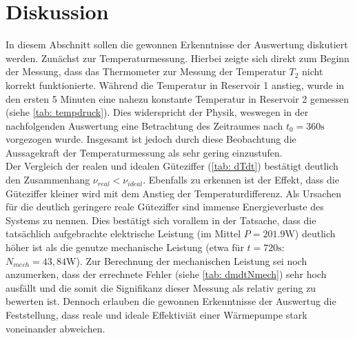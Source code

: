 \section{Diskussion}
In diesem Abschnitt sollen die gewonnen Erkenntnisse der Auswertung diskutiert werden. Zunächst zur Temperaturmessung.
Hierbei zeigte sich direkt zum Beginn der Messung, dass das Thermometer zur Messung der Temperatur $T_2$ nicht korrekt
funktionierte. Während die Temperatur in Reservoir 1 anstieg, wurde in den ersten 5 Minuten eine nahezu konstante Temperatur
in Reservoir 2 gemessen (siehe \ref{tab: tempdruck}). Dies widerspricht der Physik, weswegen in der nachfolgenden Auswertung
eine Betrachtung des Zeitraumes nach $t_0 = 360\si{\second}$ vorgezogen wurde. Insgesamt ist jedoch durch diese Beobachtung
die Aussagekraft der Temperaturmessung als sehr gering einzustufen. \\
Der Vergleich der realen und idealen Güteziffer (\ref{tab: dTdt}) bestätigt deutlich den Zusammenhang $\nu_{real} < \nu_{ideal}$. Ebenfalls
zu erkennen ist der Effekt, dass die Güteziffer kleiner wird mit dem Anstieg der Temperaturdifferenz. Als Ursachen für die deutlich
geringere reale Güteziffer sind immense Energieverluste des Systems zu nennen. Dies bestätigt sich vorallem in der Tatsache, dass die tatsächlich
aufgebrachte elektrische Leistung (im Mittel $P = 201.9 \si{\watt}$) deutlich höher ist als die genutze mechanische Leistung (etwa
für $t = 720 \si{\second}$: $N_{mech} = 43,84 \si{\watt}$). Zur Berechnung der mechanischen Leistung sei noch anzumerken, dass der errechnete
Fehler (siehe \ref{tab: dmdtNmech}) sehr hoch ausfällt und die somit die Signifikanz dieser Messung als relativ gering zu bewerten ist. Dennoch %
erlauben die gewonnen Erkenntnisse der Auswertug die Feststellung, dass reale und ideale Effektiviät einer Wärmepumpe stark voneinander abweichen.
